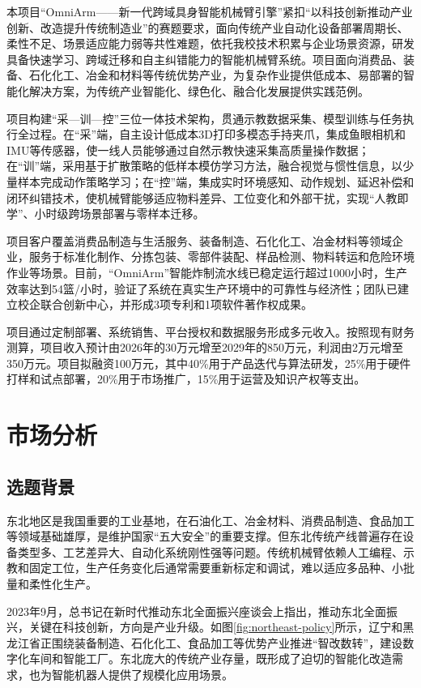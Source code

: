 \documentclass[zihao=-4]{ctexart}
\begin{document}
本项目“OmniArm——新一代跨域具身智能机械臂引擎”紧扣“以科技创新推动产业创新、改造提升传统制造业”的赛题要求，面向传统产业自动化设备部署周期长、柔性不足、场景适应能力弱等共性难题，依托我校技术积累与企业场景资源，研发具备快速学习、跨域迁移和自主纠错能力的智能机械臂系统。项目面向消费品、装备、石化化工、冶金和材料等传统优势产业，为复杂作业提供低成本、易部署的智能化解决方案，为传统产业智能化、绿色化、融合化发展提供实践范例。

项目构建“采—训—控”三位一体技术架构，贯通示教数据采集、模型训练与任务执行全过程。在“采”端，自主设计低成本3D打印多模态手持夹爪，集成鱼眼相机和IMU等传感器，使一线人员能够通过自然示教快速采集高质量操作数据；在“训”端，采用基于扩散策略的低样本模仿学习方法，融合视觉与惯性信息，以少量样本完成动作策略学习；在“控”端，集成实时环境感知、动作规划、延迟补偿和闭环纠错技术，使机械臂能够适应物料差异、工位变化和外部干扰，实现“人教即学”、小时级跨场景部署与零样本迁移。

项目客户覆盖消费品制造与生活服务、装备制造、石化化工、冶金材料等领域企业，服务于标准化制作、分拣包装、零部件装配、样品检测、物料转运和危险环境作业等场景。目前，“OmniArm”智能炸制流水线已稳定运行超过1000小时，生产效率达到54篮/小时，验证了系统在真实生产环境中的可靠性与经济性；团队已建立校企联合创新中心，并形成3项专利和1项软件著作权成果。

项目通过定制部署、系统销售、平台授权和数据服务形成多元收入。按照现有财务测算，项目收入预计由2026年的30万元增至2029年的850万元，利润由2万元增至350万元。项目拟融资100万元，其中40\%用于产品迭代与算法研发，25\%用于硬件打样和试点部署，20\%用于市场推广，15\%用于运营及知识产权等支出。

\section{市场分析}

\subsection{选题背景}

东北地区是我国重要的工业基地，在石油化工、冶金材料、消费品制造、食品加工等领域基础雄厚，是维护国家“五大安全”的重要支撑。但东北传统产线普遍存在设备类型多、工艺差异大、自动化系统刚性强等问题。传统机械臂依赖人工编程、示教和固定工位，生产任务变化后通常需要重新标定和调试，难以适应多品种、小批量和柔性化生产。

2023年9月，总书记在新时代推动东北全面振兴座谈会上指出，推动东北全面振兴，关键在科技创新，方向是产业升级。如图\ref{fig:northeast-policy}所示，辽宁和黑龙江省正围绕装备制造、石化化工、食品加工等优势产业推进“智改数转”，建设数字化车间和智能工厂。东北庞大的传统产业存量，既形成了迫切的智能化改造需求，也为智能机器人提供了规模化应用场景。
\end{document}
